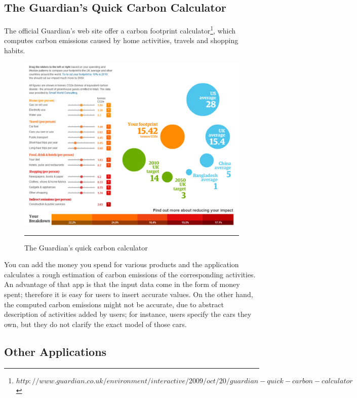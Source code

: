 \subsection{The Guardian's Quick Carbon Calculator}

The official Guardian's web site offer a carbon footprint calculator\footnote{$http://www.guardian.co.uk/environment/interactive/2009/oct/20/guardian-quick-carbon-calculator$}, which computes carbon emissions caused by home activities, travels and shopping habits.

\begin{figure}[htbp]
	\centering
		\includegraphics[scale=0.35]{./Figures/chapter2/figure22.pdf}
		\rule{35em}{0.5pt}
	\caption[The Guardian's quick carbon calculator]{The Guardian's quick carbon calculator}
	\label{fig:guardiansCarbonCalculator}
\end{figure}

You can add the money you spend for various products and the application calculates a rough estimation of carbon emissions of the corresponding activities. An advantage of that app is that the input data come in the form of money spent; therefore it is easy for users to insert accurate values. On the other hand, the computed carbon emissions might not be accurate, due to abstract description of activities added by users; for instance, users specify the cars they own, but they do not clarify the exact model of those cars.

\subsection{Other Applications}

